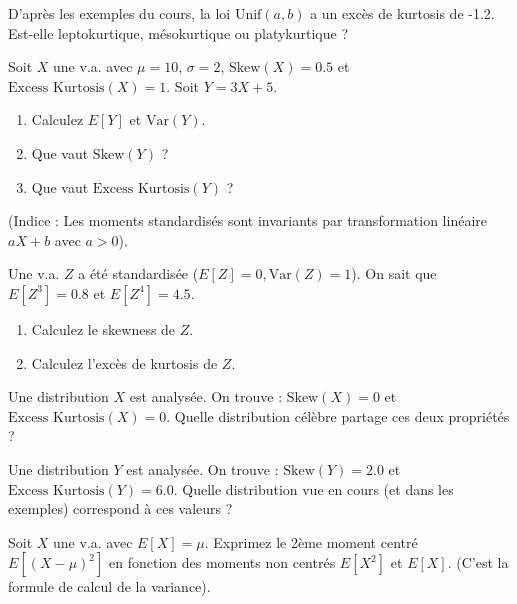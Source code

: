 \begin{exercicebox}
D'après les exemples du cours, la loi $\text{Unif}(a, b)$ a un excès de kurtosis de -1.2.
Est-elle leptokurtique, mésokurtique ou platykurtique ?
\end{exercicebox}


\begin{exercicebox}
Soit $X$ une v.a. avec $\mu=10$, $\sigma=2$, $\text{Skew}(X) = 0.5$ et $\text{Excess Kurtosis}(X) = 1$.
Soit $Y = 3X + 5$.
\begin{enumerate}
    \item Calculez $E[Y]$ et $\text{Var}(Y)$.
    \item Que vaut $\text{Skew}(Y)$ ?
    \item Que vaut $\text{Excess Kurtosis}(Y)$ ?
\end{enumerate}
(Indice : Les moments standardisés sont invariants par transformation linéaire $aX+b$ avec $a>0$).
\end{exercicebox}

\begin{exercicebox}
Une v.a. $Z$ a été standardisée ($E[Z]=0, \text{Var}(Z)=1$).
On sait que $E[Z^3] = 0.8$ et $E[Z^4] = 4.5$.
\begin{enumerate}
    \item Calculez le skewness de $Z$.
    \item Calculez l'excès de kurtosis de $Z$.
\end{enumerate}
\end{exercicebox}

\begin{exercicebox}
Une distribution $X$ est analysée. On trouve :
$\text{Skew}(X) = 0$ et $\text{Excess Kurtosis}(X) = 0$.
Quelle distribution célèbre partage ces deux propriétés ?
\end{exercicebox}

\begin{exercicebox}
Une distribution $Y$ est analysée. On trouve :
$\text{Skew}(Y) = 2.0$ et $\text{Excess Kurtosis}(Y) = 6.0$.
Quelle distribution vue en cours (et dans les exemples) correspond à ces valeurs ?
\end{exercicebox}

\begin{exercicebox}
Soit $X$ une v.a. avec $E[X] = \mu$.
Exprimez le 2ème moment centré $E[(X-\mu)^2]$ en fonction des moments non centrés $E[X^2]$ et $E[X]$. (C'est la formule de calcul de la variance).
\end{exercicebox}

